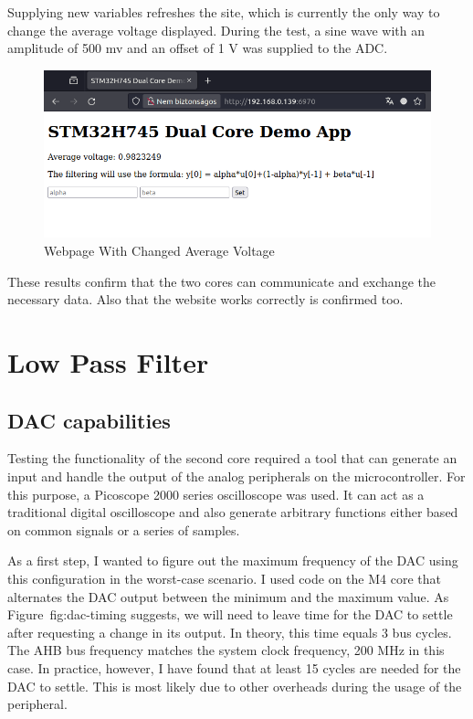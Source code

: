 Supplying new variables refreshes the site, which is currently the only way to change the average voltage displayed. During the test, a sine wave with an amplitude of 500 mv and an offset of 1 V was supplied to the ADC.

\begin{figure}[H]
    \centering
    \includegraphics[width=150mm, keepaspectratio]{figures/webpage-test2.png}
    \caption{Webpage With Changed Average Voltage}
    \label{fig:webpage-test2}
\end{figure}

These results confirm that the two cores can communicate and exchange the necessary data. Also that the website works correctly is confirmed too.

\section{Low Pass Filter}

\subsection{DAC capabilities}

Testing the functionality of the second core required a tool that can generate an input and handle the output of the analog peripherals on the microcontroller. For this purpose, a Picoscope 2000 series oscilloscope was used. It can act as a traditional digital oscilloscope and also generate arbitrary functions either based on common signals or a series of samples.

As a first step, I wanted to figure out the maximum frequency of the DAC using this configuration in the worst-case scenario. I used code on the M4 core that alternates the DAC output between the minimum and the maximum value. As Figure~{fig:dac-timing} suggests, we will need to leave time for the DAC to settle after requesting a change in its output. In theory, this time equals 3 bus cycles. The AHB bus frequency matches the system clock frequency, 200 MHz in this case. In practice, however, I have found that at least 15 cycles are needed for the DAC to settle. This is most likely due to other overheads during the usage of the peripheral.

